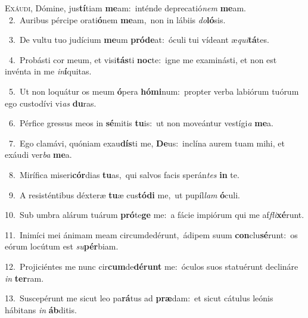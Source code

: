 \lettrine{\initial\textcolor{\initialcolor}{E}}{xáudi,} Dómine, jus\-\textbf{tí}\-tiam \textbf{me}\-am:~\star inténde deprecatió\textit{nem} \textbf{me}\-am.\\
{\numbfont\textcolor{\numbcolor}{~2.}}~Auribus pércipe orati\-\textbf{ó}\-nem \textbf{me}\-am,~\star non in lábiis \textit{do}\-\textbf{ló}sis.\par
{\numbfont\textcolor{\numbcolor}{~3.}}~De vultu tuo judícium \textbf{me}\-um \textbf{pród}\-\textbf{e}at:~\star óculi tui vídeant æ\-\textit{qui}\-\textbf{tá}tes.\par
{\numbfont\textcolor{\numbcolor}{~4.}}~Probásti cor meum, et visi\-\textbf{tás}\-ti \textbf{noc}\-te:~\star igne me examinásti, et non est invénta in me \textit{in}\-\textbf{í}quitas.\par
{\numbfont\textcolor{\numbcolor}{~5.}}~Ut non loquátur os meum \textbf{ó}\-pera \textbf{hó}\-\textbf{mi}num:~\star propter verba labiórum tuórum ego custodívi vi\textit{as} \textbf{du}\-ras.\par
{\numbfont\textcolor{\numbcolor}{~6.}}~Pérfice gressus meos in \textbf{sé}\-mitis \textbf{tu}\-is:~\star ut non moveántur vestígi\textit{a} \textbf{me}\-a.\par
{\numbfont\textcolor{\numbcolor}{~7.}}~Ego clamávi, quóniam exau\-\textbf{dís}\-ti me, \textbf{De}\-us:~\star inclína aurem tuam mihi, et exáudi ver\textit{ba} \textbf{me}\-a.\par
{\numbfont\textcolor{\numbcolor}{~8.}}~Mirífica miseri\-\textbf{cór}\-dias \textbf{tu}\-as,~\star qui salvos facis sperán\textit{tes} \textbf{in} te.\par
{\numbfont\textcolor{\numbcolor}{~9.}}~A resisténtibus déxteræ \textbf{tu}\-æ cus\-\textbf{tó}\-\textbf{di} me,~\star ut pupíl\textit{lam} \textbf{ó}\-culi.\par
{\numbfont\textcolor{\numbcolor}{10.}}~Sub umbra alárum tuárum \textbf{pró}\-te\textbf{ge} me:~\star a fácie impiórum qui me af\-\textit{fli}\-\textbf{xé}runt.\par
{\numbfont\textcolor{\numbcolor}{11.}}~Inimíci mei ánimam meam circumdedérunt,~\dagger ádipem suum \textbf{con}\-clu\-\textbf{sé}\-runt:~\star os eórum locútum est \textit{su}\-\textbf{pér}biam.\par
{\numbfont\textcolor{\numbcolor}{12.}}~Projiciéntes me nunc cir\-\textbf{cum}\-de\-\textbf{dé}\-\textbf{runt} me:~\star óculos suos statuérunt declináre \textit{in} \textbf{ter}\-ram.\par
{\numbfont\textcolor{\numbcolor}{13.}}~Suscepérunt me sicut leo pa\-\textbf{rá}\-tus ad \textbf{præ}\-dam:~\star et sicut cátulus leónis hábitans \textit{in} \textbf{áb}\-ditis.\par
